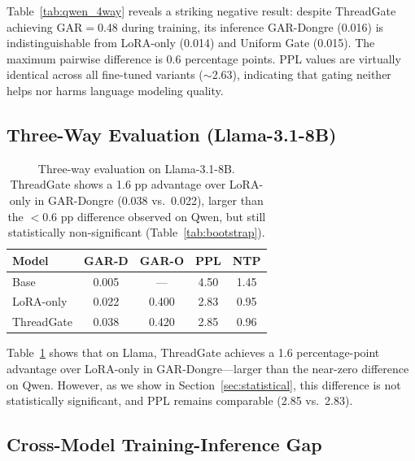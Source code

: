 \documentclass[11pt]{article}
\begin{document}
Table~\ref{tab:qwen_4way} reveals a striking negative result: despite ThreadGate achieving GAR$=$0.48 during training, its inference GAR-Dongre (0.016) is indistinguishable from LoRA-only (0.014) and Uniform Gate (0.015).
The maximum pairwise difference is 0.6 percentage points.
PPL values are virtually identical across all fine-tuned variants ($\sim$2.63), indicating that gating neither helps nor harms language modeling quality.

\subsection{Three-Way Evaluation (Llama-3.1-8B)}

\begin{table}[t]
\centering
\small
\begin{tabular}{lcccc}
\toprule
\textbf{Model} & \textbf{GAR-D} & \textbf{GAR-O} & \textbf{PPL} & \textbf{NTP} \\
\midrule
Base       & 0.005 & ---   & 4.50 & 1.45 \\
LoRA-only  & 0.022 & 0.400 & 2.83 & 0.95 \\
ThreadGate & 0.038 & 0.420 & 2.85 & 0.96 \\
\bottomrule
\end{tabular}
\caption{Three-way evaluation on Llama-3.1-8B. ThreadGate shows a 1.6 pp advantage over LoRA-only in GAR-Dongre (0.038 vs.\ 0.022), larger than the $<$0.6 pp difference observed on Qwen, but still statistically non-significant (Table~\ref{tab:bootstrap}).}
\label{tab:llama_3way}
\end{table}

Table~\ref{tab:llama_3way} shows that on Llama, ThreadGate achieves a 1.6 percentage-point advantage over LoRA-only in GAR-Dongre---larger than the near-zero difference on Qwen.
However, as we show in Section~\ref{sec:statistical}, this difference is not statistically significant, and PPL remains comparable (2.85 vs.\ 2.83).

\subsection{Cross-Model Training-Inference Gap}
\end{document}
